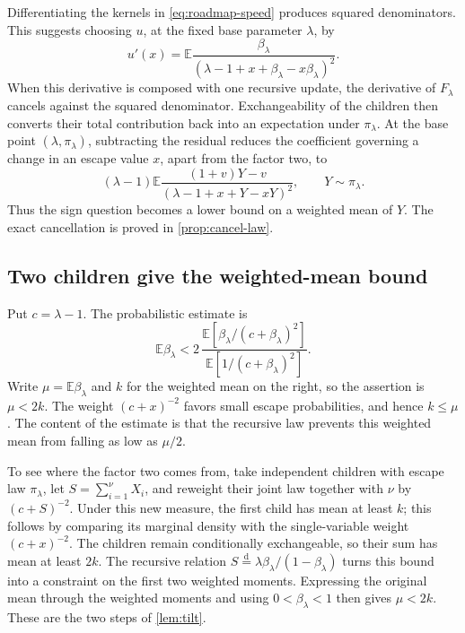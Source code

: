 \documentclass[11pt,a4paper]{article}
\numberwithin{equation}{section}
\theoremstyle{notethm}
\theoremstyle{definition}
\newcommand{\E}{\mathbb E}
\begin{document}
Differentiating the kernels in \eqref{eq:roadmap-speed} produces squared
denominators. This suggests choosing $u$, at the fixed base parameter
$\lambda$, by
\begin{equation}\label{eq:roadmap-corrector}
 u'(x)=\E\frac{\beta_\lambda}
 {(\lambda-1+x+\beta_\lambda-x\beta_\lambda)^2}.
\end{equation}
When this derivative is composed with one recursive update, the derivative
of $F_\lambda$ cancels against the squared denominator. Exchangeability of
the children then converts their total contribution back into an
expectation under $\pi_\lambda$.
At the base point $(\lambda,\pi_\lambda)$, subtracting the residual
reduces the coefficient governing a change in an escape value $x$,
apart from the factor two, to
\[
 (\lambda-1)\E
 \frac{(1+v)Y-v}{(\lambda-1+x+Y-xY)^2},
 \qquad Y\sim\pi_\lambda.
\]
Thus the sign question becomes a lower bound on a weighted mean of $Y$.
The exact cancellation is proved in \cref{prop:cancel-law}.

\subsection{Two children give the weighted-mean bound}

Put $c=\lambda-1$. The probabilistic estimate is
\begin{equation}\label{eq:roadmap-tilt}
 \boxed{\quad
 \E\beta_\lambda
 <2\,
 \frac{\E[\beta_\lambda/(c+\beta_\lambda)^2]}
      {\E[1/(c+\beta_\lambda)^2]}.
\quad}
\end{equation}
Write $\mu=\E\beta_\lambda$ and $k$ for the weighted mean on the right,
so the assertion is $\mu<2k$. The weight $(c+x)^{-2}$ favors small escape
probabilities, and hence $k\le\mu$. The content of the estimate is that
the recursive law prevents this weighted mean from falling as low as
$\mu/2$.

To see where the factor two comes from, take independent children with
escape law $\pi_\lambda$, let $S=\sum_{i=1}^{\nu}X_i$, and reweight
their joint law together with $\nu$ by $(c+S)^{-2}$.
Under this new measure, the first child has mean at least $k$; this follows
by comparing its marginal density with the single-variable weight
$(c+x)^{-2}$. The children remain conditionally exchangeable, so their
sum has mean at least $2k$. The recursive relation
$S\overset{\mathrm d}=\lambda\beta_\lambda/(1-\beta_\lambda)$ turns
this bound into a constraint on the first two weighted moments.
Expressing the original mean through the weighted moments and using
$0<\beta_\lambda<1$ then gives $\mu<2k$.
These are the two steps of \cref{lem:tilt}.
\end{document}
